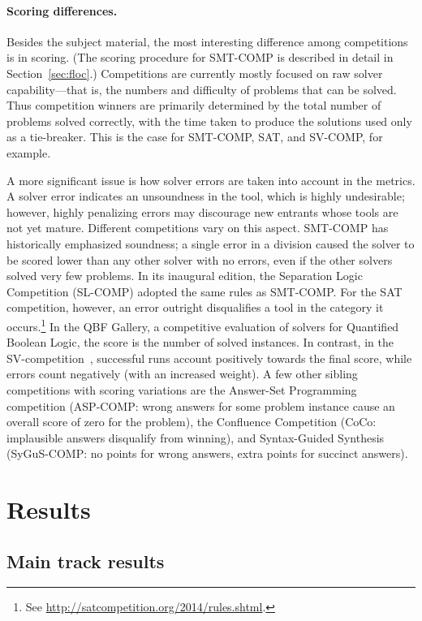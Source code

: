 \documentclass[twoside,11pt]{article}
\begin{document}
\paragraph{Scoring differences.} Besides the subject material, the most interesting difference among competitions is in scoring. (The scoring procedure for SMT-COMP is described in detail in Section~\ref{sec:floc}.) Competitions are currently mostly focused on raw solver capability---that is, the numbers and difficulty of problems that can be solved. Thus competition winners are primarily determined by the total number of problems solved correctly, with the time taken to produce the solutions used only as a tie-breaker. This is the case for SMT-COMP, SAT, and SV-COMP, for example.

A more significant issue is how solver errors are taken into account in the metrics. A solver error indicates an unsoundness in the tool, which is highly undesirable; however, highly penalizing errors may discourage new entrants whose tools are not yet mature. Different competitions vary on this aspect. SMT-COMP has historically emphasized soundness; a
single error in a division caused the solver to be scored lower than any other solver with no errors, even if the other solvers solved very few problems. In its inaugural edition, the Separation Logic Competition (SL-COMP) adopted the same rules as SMT-COMP. For the SAT competition, however, an error outright disqualifies a tool in the category it occurs.\footnote{See \url{http://satcompetition.org/2014/rules.shtml}.} In the QBF Gallery, a competitive evaluation of solvers for Quantified Boolean Logic, the score is the number of solved instances. In contrast, in the SV-competition~\cite{svcomp-2015}, successful runs account positively towards the final score, while errors count negatively (with an increased weight). 
A few other sibling competitions with scoring variations are the Answer-Set Programming competition (ASP-COMP: wrong answers for some problem instance cause an overall score of zero for the problem), the Confluence Competition (CoCo: implausible answers disqualify from winning), and Syntax-Guided Synthesis (SyGuS-COMP: no points for wrong answers, extra points for succinct answers).

\section{Results}
\label{sec:results}

\subsection{Main track results}
\label{sec:timeouts}
\end{document}
